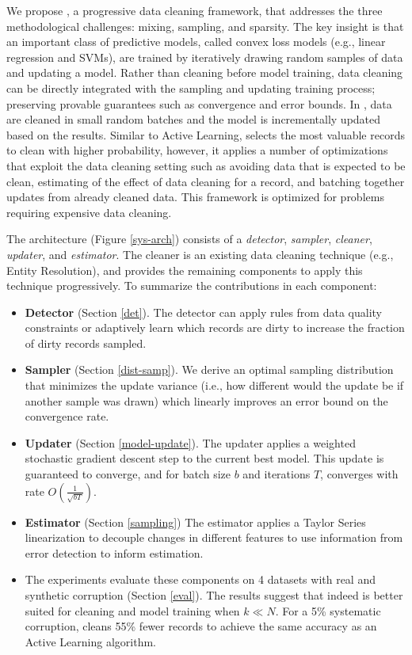 We propose \sys, a progressive data cleaning framework, that addresses the three methodological challenges: mixing, sampling, and sparsity.
The key insight is that an important class of predictive models, called convex loss models (e.g., linear regression and SVMs), are trained by iteratively drawing random samples of data and updating a model\cite{bertsekas2011incremental}.
Rather than cleaning before model training, data cleaning can be directly integrated with the sampling and updating training process; preserving provable guarantees such as convergence and error bounds.
In \sys, data are cleaned in small random batches and the model is incrementally updated based on the results.
Similar to Active Learning, \sys selects the most valuable records to clean with higher probability, however, it applies a number of optimizations that exploit the data cleaning setting such as avoiding data that is expected to be clean, estimating of the effect of data cleaning for a record, and batching together updates from already cleaned data.
This framework is optimized for problems requiring expensive data cleaning.

The \sys architecture (Figure \ref{sys-arch}) consists of a \emph{detector}, \emph{sampler}, \emph{cleaner}, \emph{updater}, and \emph{estimator}.
The cleaner is an existing data cleaning technique (e.g., Entity Resolution), and \sys provides the remaining components to apply this technique progressively.
To summarize the contributions in each component:
\begin{itemize}[noitemsep]
\item \textbf{Detector} (Section \ref{det}). The detector can apply rules from data quality constraints or adaptively learn which records are dirty to increase the fraction of dirty records sampled.
\item \textbf{Sampler} (Section \ref{dist-samp}). We derive an optimal sampling distribution that minimizes the update variance (i.e., how different would the update be if another sample was drawn) which linearly improves an error bound on the convergence rate.
\item \textbf{Updater} (Section \ref{model-update}). The updater applies a weighted stochastic gradient descent step to the current best model. This update is guaranteed to converge, and for batch size $b$ and iterations $T$, converges with rate $O(\frac{1}{\sqrt{bT}})$. 
\item \textbf{Estimator} (Section \ref{sampling}) The estimator applies a Taylor Series linearization to decouple changes in different features to use information from error detection to inform estimation.
\item The experiments evaluate these components on 4 datasets with real and synthetic corruption (Section \ref{eval}). The results suggest that indeed \sys is better suited for cleaning and model training when $k\ll N$. For a 5\%  systematic corruption, \sys cleans 55\% fewer records to achieve the same accuracy as an Active Learning algorithm.
\end{itemize}






